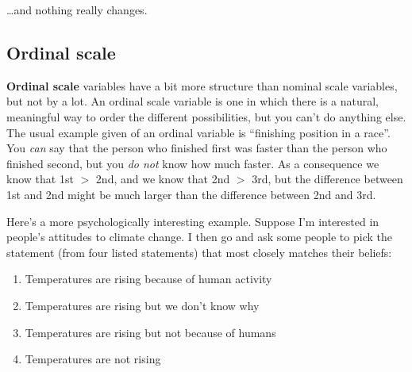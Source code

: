 \documentclass[
  a4paper,
]{book}
\providecommand{\tightlist}{%
  \setlength{\itemsep}{0pt}\setlength{\parskip}{0pt}}
\begin{document}
\begin{table}

\caption{\label{tbl-tab2-2}How did 100 people get to work today, a
different view}

\centering
{}

\end{table}%

\ldots and nothing really changes.

\subsection{Ordinal scale}\label{ordinal-scale}

\textbf{Ordinal scale} variables have a bit more structure than nominal
scale variables, but not by a lot. An ordinal scale variable is one in
which there is a natural, meaningful way to order the different
possibilities, but you can't do anything else. The usual example given
of an ordinal variable is ``finishing position in a race''. You
\emph{can} say that the person who finished first was faster than the
person who finished second, but you \emph{do not} know how much faster.
As a consequence we know that 1st \(>\) 2nd, and we know that 2nd \(>\)
3rd, but the difference between 1st and 2nd might be much larger than
the difference between 2nd and 3rd.

Here's a more psychologically interesting example. Suppose I'm
interested in people's attitudes to climate change. I then go and ask
some people to pick the statement (from four listed statements) that
most closely matches their beliefs:

\begin{enumerate}
\def\labelenumi{\arabic{enumi}.}
\tightlist
\item
  Temperatures are rising because of human activity
\item
  Temperatures are rising but we don't know why
\item
  Temperatures are rising but not because of humans
\item
  Temperatures are not rising
\end{enumerate}
\end{document}
